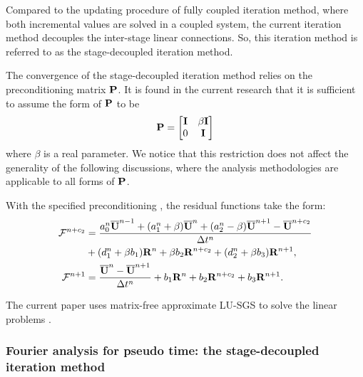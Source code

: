 Compared to the updating procedure of fully coupled iteration method,
where both incremental values are solved in a coupled system,
the current iteration method decouples the inter-stage linear connections.
So, this iteration method is referred to as the stage-decoupled iteration method.

The convergence of the stage-decoupled iteration method relies on
the preconditioning matrix $\mathbf{P}$.
It is found in the current research that it is sufficient to assume the form
of $\mathbf{P}$ to be
\begin{equation}
    \mathbf{P} = \begin{bmatrix}
        \mathbf{I} & \beta\mathbf{I} \\
        0    & \mathbf{I}
    \end{bmatrix}
    \label{eq:specialP}
\end{equation}
where $\beta$ is a real parameter.
We notice that this restriction does not affect the
generality of the following discussions,
where the analysis methodologies
are applicable to all forms of $\mathbf{P}$.

With the specified preconditioning ,
the residual functions take the form:
\begin{equation}
    \begin{aligned}
        \mathcal{F}^{n+c_2} & =
        \frac{a^n_0\overline{\mathbf{U}}^{n - 1} +
            (a^n_1+\beta)\overline{\mathbf{U}}^{n} +
            (a^n_2-\beta)\overline{\mathbf{U}}^{n + 1} - \overline{\mathbf{U}}^{n+c_2}}{{\Delta} t^n}
        \\ & +
        (d^n_1 + \beta b_1)\mathbf{R}^{n} +
        \beta b_2 \mathbf{R}^{n+c_2} +
        (d^n_2 + \beta b_3)\mathbf{R}^{n + 1},                             \\
        \mathcal{F}^{n+1}   & =    \frac{\overline{\mathbf{U}}^{n} - \overline{\mathbf{U}}^{n+1}}{{\Delta} t^n}  +
        b_1 \mathbf{R}^n +
        b_2 \mathbf{R}^{n+c_2} +
        b_3 \mathbf{R}^{n+1}.
    \end{aligned}
\end{equation}

The current paper uses matrix-free approximate LU-SGS
\cite{luo1998fast,luo2001accurate} to solve the linear problems .

\subsubsection{Fourier analysis for pseudo time: the stage-decoupled iteration method}
\label{sssec:SDSFourier}

